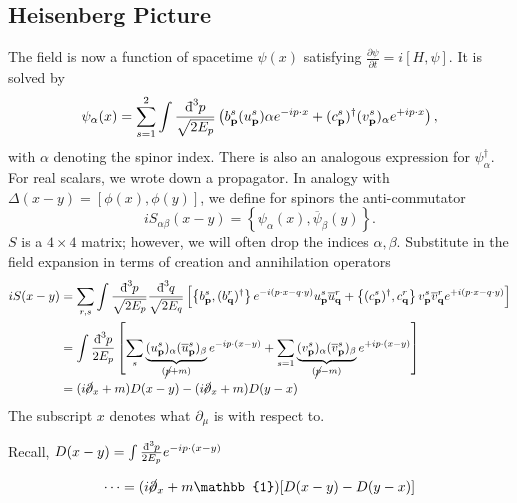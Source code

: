 \subsection*{Heisenberg Picture}%
The field is now a function of spacetime $\psi(x)$ satisfying $\frac{\partial \psi}{\partial t} = i [H, \psi]$. It is solved by
\begin{equation}
  \psi_{\alpha}(x) = \sum_{s=1}^{2} \int \frac{\bdd[3]{p}}{\sqrt{2E_{p}}} \left( b^{s}_{\vb{p}} (u^{s}_{\vb{p}})\alpha e^{-ip \cdot x} + (c^{s}_{\vb{p}})^{\dagger} (v^{s}_{\vb{p}})_{\alpha} e^{+i p \cdot x} \right),
\end{equation}
with $\alpha$ denoting the spinor index.
There is also an analogous expression for $\psi^{\dagger}_{\alpha}$.
For real scalars, we wrote down a propagator. In analogy with $\Delta(x - y) = [\phi(x), \phi(y)]$, we define for spinors the anti-commutator
\begin{equation}
  i S_{\alpha\beta} (x - y) = \left\{ \psi_{\alpha}(x), \overline{\psi}_{\beta}(y) \right\}.
\end{equation}
$S$ is a $4 \times 4$ matrix; however, we will often drop the indices $\alpha, \beta$. 
Substitute in the field expansion in terms of creation and annihilation operators 
\begin{align}
  i S( x - y) &= \sum_{r, s} \int  \frac{\bdd[3]{p}}{\sqrt{2E_{p}}} \frac{\bdd[3]{q}}{\sqrt{2E_{q}}} \left[ \left\{ b^{s}_{\vb{p}}, (b^{r}_{\vb{q}})^{\dagger} \right\} e^{-i (p \cdot x - q \cdot y)} u^{s}_{\vb{p}} \overline{u}^{r}_{\vb{q}}
  + \left\{ (c_{\vb{p}}^{s})^{\dagger} , c^{r}_{\vb{q}} \right\} v^{s}_{\vb{p}} \overline{v}^{r}_{\vb{q}} e^{+i (p \cdot x - q \cdot y)} \right] \\
	      &= \int \frac{\bdd[3]{p}}{2E_{p}} \left[ \sum_{s} \underbrace{(u^{s}_{\vb{p}})_{\alpha} (\overline{u}^{s}_{\vb{p}})_{\beta}}_{\mathclap{(\cancel{p} + m)}} e^{-i p \cdot (x - y)} 
	      + \sum_{s=1} \underbrace{(v^{s}_{\vb{p}})_{\alpha} (\overline{v}^{s}_{\vb{p}})_{\beta}}_{\mathclap{(\cancel{p} - m)}} e^{+i p \cdot ( x- y)} \right] \\
	      &= (i \cancel{\partial}_x + m) D(x - y) - (i \cancel{\partial}_x + m) D(y - x)
\end{align}
The subscript $x$ denotes what $\partial_{\mu}$ is with respect to.
\begin{leftbar}
  \begin{remark}
    Recall, $D(x - y) = \int \frac{\bdd[3]{p}}{2 E_{p}} e^{-i p \cdot (x - y)}$
  \end{remark}
\end{leftbar}
\begin{equation}
  \dots = (i \cancel{\partial}_x + m \mathbb{1}) [D(x - y) - D(y - x)]
  \label{eq:top}
\end{equation}

